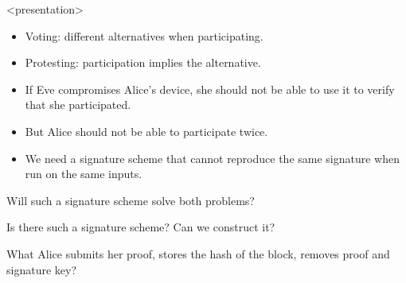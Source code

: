 \begin{frame}<presentation>
  \begin{remark}
    \begin{itemize}
      \item Voting: different alternatives when participating.
      \item Protesting: participation implies the alternative.
    \end{itemize}
  \end{remark}

  \pause

  \begin{idea}
    \begin{itemize}
      \item If Eve compromises Alice's device, she should not be able to use 
        it to verify that she participated.

      \item But Alice should not be able to participate twice.

      \item We need a signature scheme that cannot reproduce the same 
        signature when run on the same inputs.
    \end{itemize}
  \end{idea}
\end{frame}

\begin{frame}
  \begin{question}
    Will such a signature scheme solve both problems?
  \end{question}
  \begin{question}
    Is there such a signature scheme?
    Can we construct it?
  \end{question}
  \begin{question}
    What Alice submits her proof, stores the hash of the block, removes proof 
    and signature key?
  \end{question}
\end{frame}

